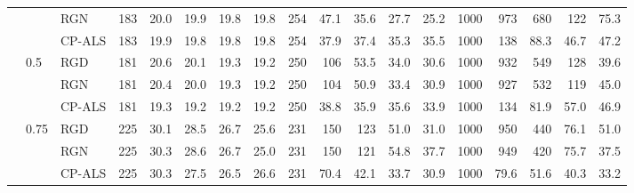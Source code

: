 \begin{table}[!htbp]
{\begin{tabular}{lll*{15}{r}}
 &  & RGN & 183 & 20.0 & 19.9 & 19.8 & 19.8 & 254 & 47.1 & 35.6 & 27.7 & 25.2 & 1000 & 973 & 680 & 122 & 75.3 \\
 &  & CP-ALS & 183 & 19.9 & 19.8 & 19.8 & 19.8 & 254 & 37.9 & 37.4 & 35.3 & 35.5 & 1000 & 138 & 88.3 & 46.7 & 47.2 \\
\addlinespace
 & 0.5 & RGD & 181 & 20.6 & 20.1 & 19.3 & 19.2 & 250 & 106 & 53.5 & 34.0 & 30.6 & 1000 & 932 & 549 & 128 & 39.6 \\
 &  & RGN & 181 & 20.4 & 20.0 & 19.3 & 19.2 & 250 & 104 & 50.9 & 33.4 & 30.9 & 1000 & 927 & 532 & 119 & 45.0 \\
 &  & CP-ALS & 181 & 19.3 & 19.2 & 19.2 & 19.2 & 250 & 38.8 & 35.9 & 35.6 & 33.9 & 1000 & 134 & 81.9 & 57.0 & 46.9 \\
\addlinespace
 & 0.75 & RGD & 225 & 30.1 & 28.5 & 26.7 & 25.6 & 231 & 150 & 123 & 51.0 & 31.0 & 1000 & 950 & 440 & 76.1 & 51.0 \\
 &  & RGN & 225 & 30.3 & 28.6 & 26.7 & 25.0 & 231 & 150 & 121 & 54.8 & 37.7 & 1000 & 949 & 420 & 75.7 & 37.5 \\
 &  & CP-ALS & 225 & 30.3 & 27.5 & 26.5 & 26.6 & 231 & 70.4 & 42.1 & 33.7 & 30.9 & 1000 & 79.6 & 51.6 & 40.3 & 33.2 \\
\bottomrule
\end{tabular}}
\end{table}
